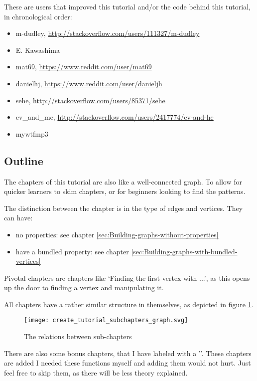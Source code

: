 These are users that improved this tutorial and/or the code behind this
tutorial, in chronological order:

\begin{itemize}
  \item m-dudley, \url{http://stackoverflow.com/users/111327/m-dudley}
  \item E. Kawashima
  \item mat69, \url{https://www.reddit.com/user/mat69}
  \item danielhj, \url{https://www.reddit.com/user/danieljh}
  \item sehe, \url{http://stackoverflow.com/users/85371/sehe}
  \item cv_and_me, \url{http://stackoverflow.com/users/2417774/cv-and-he}
  \item mywtfmp3
\end{itemize}

\subsection{Outline}

The chapters of this tutorial are also like a well-connected graph.
To allow for quicker learners to skim chapters, or for beginners looking
to find the patterns.

The distinction between the chapter is in the type of edges and vertices.
They can have:

\begin{itemize}
  \item no properties: 
    see chapter \ref{sec:Building-graphs-without-properties}
  \item have a bundled property: 
    see chapter \ref{sec:Building-graphs-with-bundled-vertices}
\end{itemize}

Pivotal chapters are chapters like `Finding the first vertex with ...', as
this opens up the door to finding a vertex and manipulating it.

All chapters have a rather similar structure in themselves, as depicted
in figure \ref{fig:The-relations-between-subchapters}.

\begin{figure}[!htbp]
  \texttt{[image: create\_tutorial\_subchapters\_graph.svg]}
  \caption{
    The relations between sub-chapters
  }
  \label{fig:The-relations-between-subchapters}
\end{figure}

There are also some bonus chapters, that I have labeled with a '\triangle'.
These chapters are added I needed these functions myself and adding them
would not hurt.
Just feel free to skip them, as there will be less theory explained.

